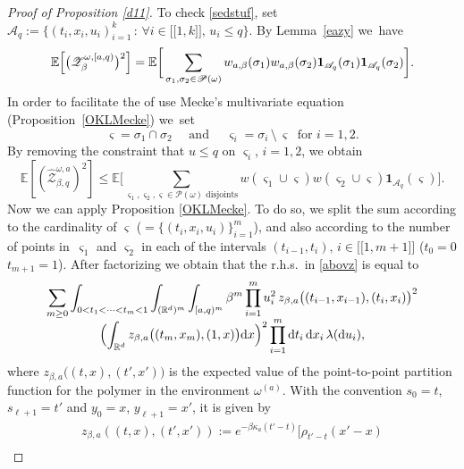 \documentclass[10pt]{amsart}
\let\mathcal\mathscr
\newcommand{\lint}{\mathopen{[\![}}
\newcommand{\rint}{\mathclose{]\!]}}
\theoremstyle{definition}
\newcommand{\dd}{\mathrm{d}}
\newcommand{\ind}{\mathbf{1}}
\newcommand{\cA}{{\ensuremath{\mathcal A}} }
\newcommand{\cP}{{\ensuremath{\mathcal P}} }
\newcommand{\cZ}{{\ensuremath{\mathcal Z}} }
\newcommand{\bbE}{{\ensuremath{\mathbb E}} }
\newcommand{\bbR}{{\ensuremath{\mathbb R}} }
\let\gb\beta
\let\go\omega
\begin{document}
\begin{proof}[Proof of Proposition \ref{d11}]
To check \eqref{sedstuf}, set
$\cA_q:=\{ (t_i,x_i,u_i)^k_{i=1} \, : \, \forall i\in \lint 1,k\rint,\, u_i\le q \}$.
By Lemma~\ref{eazy} we~have
\begin{equation}
\bbE \Bigl[ \bigl(\cZ^{\go,[a,q)}_{\beta} \bigr)^2 \Bigr]= \bbE \bigg[ \sum_{\sigma_1, \sigma_2 \in \cP(\go)} w_{a,\beta}(\sigma_1)w_{a,\beta}(\sigma_2) \ind_{\cA_q}(\sigma_1)\ind_{\cA_q}(\sigma_2) \bigg].
\end{equation}
In order to facilitate the of use Mecke's multivariate equation (Proposition~\ref{OKLMecke}) we~set%
\begin{equation}\label{lanotat}
\varsigma=\sigma_1 \cap \sigma_2 \quad \text{ and } \quad \varsigma_i=\sigma_i\, \setminus\, \varsigma \ \text{ for } i=1,2.
\end{equation}
By removing the constraint that $u\leq q$ on $\varsigma_i$, $i=1,2$, we obtain
\begin{equation}\label{abovz}
\bbE \left[ (\hat \cZ^{\go,a}_{\beta,q})^2 \right]\le
\bbE \bigg[ \sum_{\varsigma_1, \varsigma_2, \varsigma\in \cP(\go) \text{ disjoints}} w(\varsigma_1\cup \varsigma)w(\varsigma_2\cup \varsigma) \ind_{\cA_q}(\varsigma) \bigg].
\end{equation}
Now we can apply
Proposition \ref{OKLMecke}. To do so, we split the sum according to the cardinality of $\varsigma$ ($=\{ (t_i,x_i,u_i)\}^m_{i=1}$), and also according to the number of points in~$\varsigma_1$ and $\varsigma_2$
in each of the intervals $(t_{i-1},t_i)$, $i\in\lint 1, m+1\rint$ ($t_0=0$ $t_{m+1}=1$).
After factorizing
we obtain that the r.h.s.\ in \eqref{abovz} is equal to\vspace*{-5pt}
\begin{multline}\label{zruc}
\sum_{m \ge 0} \int_{0<t_1<\dots<t_m<1} \int_{ (\bbR^d)^m} \int_{[a,q)^m} \gb^{m}
\prod_{i=1}^{m} u_i^2 \, z_{\beta,a}\bigl((t_{i-1},x_{i-1}), (t_{i},x_{i}) \bigr)^2
\\[-5pt]
\Bigl(\int_{\bbR^d} z_{\beta,a}\bigl((t_m,x_m), (1,x) \bigr) \dd x \Bigr)^2 \prod_{i=1}^m \dd t_i\, \dd x_i\, \lambda(\dd u_i),
\end{multline}
where $z_{\beta,a}\bigl((t,x), (t',x') \bigr)$ is the expected value of the point-to-point partition function for the polymer in the environment $\go^{(a)}$. With the convention $s_0=t$, $s_{\ell+1}=t'$ and $y_0=x$, $y_{\ell+1} =x'$, it is given by\vspace*{-5pt}
\begin{multline}\label{zruc2}
z_{\beta,a} ((t,x), (t',x'))
:= e^{ -\gb \kappa_a (t'-t)}
\bigg[ \rho_{t'-t}(x'-x)\\

\end{multline}
\end{proof}
\end{document}
